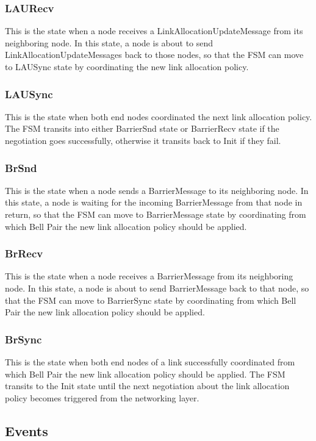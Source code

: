 \subsubsection{LAURecv}
This is the state when a node receives a LinkAllocationUpdateMessage from its neighboring node. 
In this state, a node is about to send LinkAllocationUpdateMessages back to those nodes, so that the FSM can move to LAUSync state by coordinating the new link allocation policy.

\subsubsection{LAUSync}
This is the state when both end nodes coordinated the next link allocation policy.
The FSM transits into either BarrierSnd state or BarrierRecv state if the negotiation goes successfully, otherwise it transits back to Init if they fail.

\subsubsection{BrSnd}
This is the state when a node sends a BarrierMessage to its neighboring node. 
In this state, a node is waiting for the incoming BarrierMessage from that node in return, 
so that the FSM can move to BarrierMessage state by coordinating from which Bell Pair the new link allocation policy should be applied.

\subsubsection{BrRecv}
This is the state when a node receives a BarrierMessage from its neighboring node. 
In this state, a node is about to send BarrierMessage back to that node, 
so that the FSM can move to BarrierSync state by coordinating from which Bell Pair the new link allocation policy should be applied.

\subsubsection{BrSync}
This is the state when both end nodes of a link successfully coordinated from which Bell Pair the new link allocation policy should be applied.
The FSM transits to the Init state until the next negotiation about the link allocation policy becomes triggered from the networking layer.

\subsection{Events}


